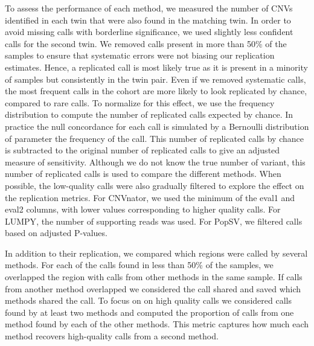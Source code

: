 To assess the performance of each method, we measured the number of CNVs identified in each twin that were also found in the matching twin. In order to avoid missing calls with borderline significance, we used slightly less confident calls for the second twin. We removed calls present in more than 50\% of the samples to ensure that systematic errors were not biasing our replication estimates. Hence, a replicated call is most likely true as it is present in a minority of samples but consistently in the twin pair. Even if we removed systematic calls, the most frequent calls in the cohort are more likely to look replicated by chance, compared to rare calls. To normalize for this effect, we use the frequency distribution to compute the number of replicated calls expected by chance. In practice the null concordance for each call is simulated by a Bernoulli distribution of parameter the frequency of the call. This number of replicated calls by chance is subtracted to the original number of replicated calls to give an adjusted measure of sensitivity. Although we do not know the true number of variant, this number of replicated calls is used to compare the different methods.
When possible, the low-quality calls were also gradually filtered to explore the effect on the replication metrics.
For {\sf CNVnator}, we used the minimum of the eval1 and eval2 columns, with lower values corresponding to higher quality calls.
For {\sf LUMPY}, the number of supporting reads was used.
For {\sf PopSV}, we filtered calls based on adjusted P-values.

In addition to their replication, we compared which regions were called by several methods.
For each of the calls found in less than 50\% of the samples, we overlapped the region with calls from other methods in the same sample.
If calls from another method overlapped we considered the call shared and saved which methods shared the call.
To focus on on high quality calls we considered calls found by at least two methods and computed the proportion of calls from one method found by each of the other methods.
This metric captures how much each method recovers high-quality calls from a second method.



